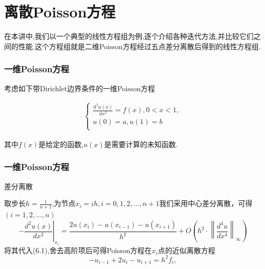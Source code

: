 \documentclass[notheorems,serif]{beamer}
\renewcommand{\normalsize}{\wuhao}
\newcommand{\wuhao}{\fontsize{10.5pt}{\baselineskip}\selectfont}
\begin{document}
\newpage
\section{离散Poisson方程}

\begin{frame}
在本讲中,我们以一个典型的线性方程组为例,逐个介绍各种迭代方法,并比较它们之间的性能.这个方程组就是二维Poisson方程经过五点差分离散后得到的线性方程组.
\end{frame}

\begin{frame}\frametitle{一维Poisson方程}
考虑如下带Dirichlet边界条件的一维Poisson方程

\begin{align}
\begin{cases}
	\frac{\mathrm{d^2} u(x)}{\mathrm{d}x^2} =f(x),0<x<1,\\
	u(0)=a,u(1) = b\\
\end{cases}
\tag{6.1}
\end{align}

其中$f(x)$是给定的函数,$u(x)$是需要计算的未知函数.
\end{frame} 

\begin{frame}\frametitle{一维Poisson方程}
{\color{blue}\Large 差分离散}

\quad

\normalsize
取步长$h=\frac{1}{n+1}$,为节点$x_i=ih,i=0,1,2,...,n+1$我们采用中心差分离散，可得$(i=1,2,...,n)$
$$
-\left.\frac{d^{2} u(x)}{d x^{2}}\right|_{x_{i}}=\frac{2 u\left(x_{i}\right)-u\left(x_{i-1}\right)-u\left(x_{i+1}\right)}{h^{2}}+O\left(h^{2} \cdot\left\|\frac{d^{4} u}{d x^{4}}\right\|_{\infty}\right)
$$
将其代入(6.1),舍去高阶项后可得Poisson方程在$x_i$点的近似离散方程
$$\boxed{-u_{i-1}+2u_i-u_{i+1}=h^2f_i,}$$
\end{frame}
\end{document}

